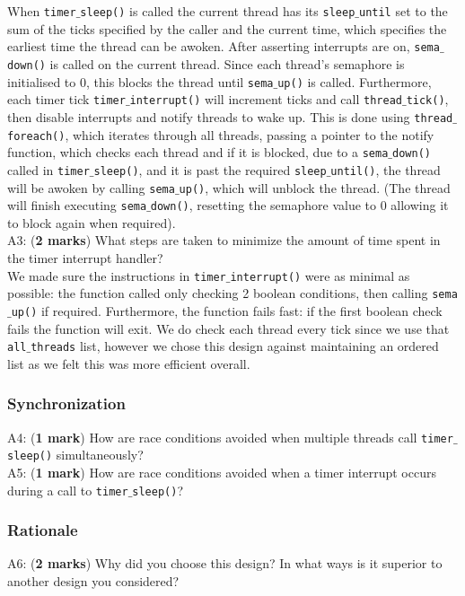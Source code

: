 \documentclass[a4paper,12pt]{article}
\begin{document}
When \texttt{timer$\_$sleep()} is called the current thread has its \texttt{sleep$\_$until} set to the sum of the ticks specified by the caller and the current time, which specifies the earliest time the thread can be awoken. After asserting interrupts are on, \texttt{sema$\_$down()} is called on the current thread. Since each thread's semaphore is initialised to 0, this blocks the thread until \texttt{sema$\_$up()} is called. Furthermore, each timer tick \texttt{timer$\_$interrupt()} will increment ticks and call \texttt{thread$\_$tick()}, then disable interrupts and notify threads to wake up. This is done using \texttt{thread$\_$foreach()}, which iterates through all threads, passing a pointer to the notify function, which checks each thread and if it is blocked, due to a \texttt{sema$\_$down()} called in \texttt{timer$\_$sleep()}, and it is past the required \texttt{sleep$\_$until()}, the thread will be awoken by calling \texttt{sema$\_$up()}, which will unblock the thread. (The thread will finish executing \texttt{sema$\_$down()}, resetting the semaphore value to 0 allowing it to block again when required). \\

A3: ({\bf 2 marks}) What steps are taken to minimize the amount of time spent in the timer interrupt handler? \\

We made sure the instructions in \texttt{timer$\_$interrupt()} were as minimal as possible: the function called only checking 2 boolean conditions, then calling \texttt{sema$\_$up()} if required. Furthermore, the function fails fast: if the first boolean check fails the function will exit. We do check each thread every tick since we use that \texttt{all$\_$threads} list, however we chose this design against maintaining an ordered list as we felt this was more efficient overall. \\

\subsubsection*{Synchronization}
A4: ({\bf 1 mark}) How are race conditions avoided when multiple threads call \texttt{timer$\_$sleep()} simultaneously? \\
A5: ({\bf 1 mark}) How are race conditions avoided when a timer interrupt occurs during a call to \texttt{timer$\_$sleep()}? \\

\subsubsection*{Rationale}
A6: ({\bf 2 marks}) Why did you choose this design?
In what ways is it superior to another design you considered? \\
\end{document}
